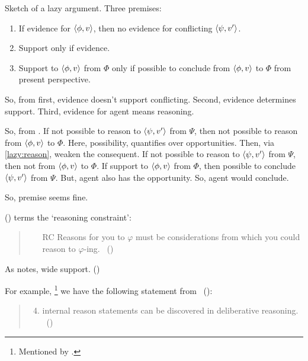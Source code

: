 \begin{note}
  Sketch of a lazy argument.
  Three premises:
  \begin{enumerate}
  \item
    \label{lazy:evidence-constraint}
    If evidence for \(\langle \phi, v \rangle\), then no evidence for conflicting \(\langle \psi, v' \rangle\).
  \item
    \label{lazy:evidence}
    Support only if evidence.
  \item
    \label{lazy:reason}
    Support to \(\langle \phi, v \rangle\) from \(\Phi\) only if possible to conclude from \(\langle \phi, v \rangle\) to \(\Phi\) from present perspective.
  \end{enumerate}

  So, from first, evidence doesn't support conflicting.
  Second, evidence determines support.
  Third, evidence for agent means reasoning.


  So, from \requ{}.
  If not possible to reason to \(\langle \psi, v' \rangle\) from \(\Psi\), then not possible to reason from \(\langle \phi, v \rangle\) to \(\Phi\).
  Here, possibility, quantifies over opportunities.
  Then, via \ref{lazy:reason}, weaken the consequent.
  If not possible to reason to \(\langle \psi, v' \rangle\) from \(\Psi\), then not \support{} from \(\langle \phi, v \rangle\) to \(\Phi\).
  If support to \(\langle \phi, v \rangle\) from \(\Phi\), then possible to conclude \(\langle \psi, v' \rangle\) from \(\Psi\).
  But, agent also has the opportunity.
  So, agent would conclude.

  So, premise seems fine.

  \citeauthor{Way:2016vq} (\citeyear{Way:2016vq}) terms the `reasoning constraint':

  \begin{quote}
    \begin{enumerate}
    \item[RC] Reasons for you to \(\varphi\) must be considerations from which you could reason to \(\varphi\)-ing.%
      \mbox{ }\hfill\mbox{(\citeyear[806]{Way:2016vq})}
    \end{enumerate}
  \end{quote}
  As \citeauthor{Way:2016vq} notes, wide support. (\citeyear[806]{Way:2016vq})

  For example,%
  \footnote{Mentioned by \textcite{Way:2016vq}.}
  we have the following statement from~\citeauthor{Williams:1979wi} (\citeyear{Williams:1979wi}):
  \begin{quote}
    \begin{enumerate}[label=(\roman*)]
      \setcounter{enumi}{3}
    \item internal reason statements can be discovered in deliberative reasoning.%
      \mbox{ }\hfill\mbox{(\citeyear[19]{Williams:1979wi})}
    \end{enumerate}
  \end{quote}
\end{note}

